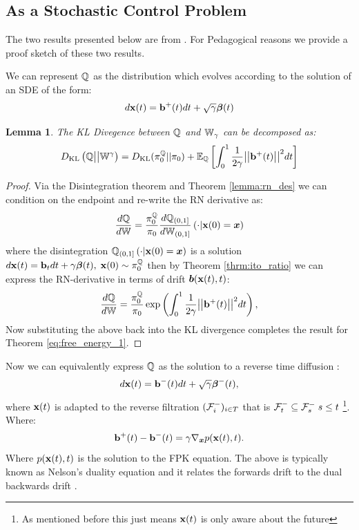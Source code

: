 \documentclass[a4paper,12pt,twoside,openright]{report}
\newtheorem{lemma}[theorem]{Lemma}
\theoremstyle{definition}
\begin{document}
\subsection{As a Stochastic Control Problem}

The two results presented below are from \cite{pavon1991free}. For Pedagogical reasons we provide a proof sketch of these two results.

We can represent ${\mathbb{Q}}$ as the distribution which evolves according to the solution of an SDE of the form:
\begin{align*}
    d{\mathbf{x}}(t) = {\mathbf{b}}^{+}(t) dt + \sqrt{\gamma} {\bm{\beta}}(t)
\end{align*}
\begin{lemma}\citep{pavon1991free}
    The KL Divegence between ${\mathbb{Q}}$ and $\mathbb{W}_{\gamma}$ can be decomposed as:
\begin{align}\label{eq:free_energy_1}
     D_{\mathrm{KL}}\left({\mathbb{Q}} \big|\big| \mathbb{W}^{\gamma}\right) = D_{\mathrm{KL}}(\pi^{{\mathbb{Q}}}_0 || \pi_0) + \mathbb{E}_{\mathbb{Q}}\left[\int_0^1 \frac{1}{2\gamma}\big|\big|{\mathbf{b}}^{+}(t) \big|\big|^2 dt\right]
\end{align}
\end{lemma}
\begin{proof}
Via the Disintegration theorem and Theorem \ref{lemma:rn_des} we can condition on the endpoint and re-write the RN derivative as:
\begin{align*}
    \frac{d{\mathbb{Q}}}{d\mathbb{W}} = \frac{\pi_0^{\mathbb{Q}}}{\pi_0} \frac{d{\mathbb{Q}}_{(0,1]}}{d\mathbb{W}_{(0,1]}}\left(\cdot | {\mathbf{x}}(0) ={\bm{x}}\right)
\end{align*}
where the disintegration ${\mathbb{Q}}_{(0,1]}\left(\cdot | {\mathbf{x}}(0) = {\bm{x}} \right)$ is a solution $d{\mathbf{x}}(t) = {\mathbf{b}}_t dt + \gamma {\bm{\beta}}(t), \; {\mathbf{x}}(0) \sim \pi_0^{\mathbb{Q}}$ then by Theorem \ref{thrm:ito_ratio} we can express the RN-derivative in terms of  drift ${\bm{b}}({\mathbf{x}}(t), t)$:
\begin{align*}
    \frac{d{\mathbb{Q}}}{d\mathbb{W}} = \frac{\pi_0^{\mathbb{Q}}}{\pi_0}\exp\left(\int_0^1\frac{1}{2\gamma} \big|\big|{\mathbf{b}}^+(t)\big|\big|^2 dt\right),
\end{align*}
Now substituting the above back into the KL divergence completes the result for Theorem \ref{eq:free_energy_1}.
\end{proof}
Now we can equivalently express ${\mathbb{Q}}$ as the solution to a reverse time diffusion :
\begin{align}
    d{\mathbf{x}}(t) = {\mathbf{b}}^{-}(t) dt + \sqrt{\gamma} {\bm{\beta}}^{-}(t), 
\end{align}
where ${\mathbf{x}}(t)$ is adapted to the reverse filtration $({\mathcal{F}}^{-}_i)_{i\in T}$ that is ${\mathcal{F}}^{-}_t \subseteq {\mathcal{F}}^{-}_s \; s \leq t $ \footnote{As mentioned before this just means ${\mathbf{x}}(t)$  is only aware about the future}.  Where:
\begin{align}\label{eq:nelson}
    {{\mathbf{b}}^{+}(t) - {\mathbf{b}}^{-}(t)} =\gamma \nabla_{{\bm{x}}} p({\mathbf{x}}(t), t).
\end{align}
Where $p({\mathbf{x}}(t), t)$ is the solution to the FPK equation. The above is typically known as Nelson's duality equation and it relates the forwards drift to the dual backwards drift \citep{nelson1967dynamical}. 
\end{document}
